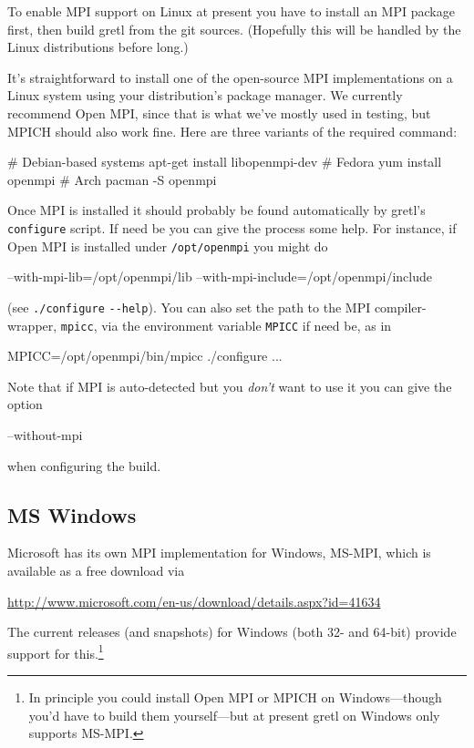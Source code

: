 \documentclass{article}
\begin{document}
To enable MPI support on Linux at present you have to install an MPI
package first, then build gretl from the git sources. (Hopefully this
will be handled by the Linux distributions before long.)

It's straightforward to install one of the open-source MPI
implementations on a Linux system using your distribution's package
manager. We currently recommend \textsf{Open MPI}, since that is what
we've mostly used in testing, but \textsf{MPICH} should also work
fine.  Here are three variants of the required command:
\begin{code}
# Debian-based systems
apt-get install libopenmpi-dev
# Fedora
yum install openmpi
# Arch
pacman -S openmpi
\end{code}

Once MPI is installed it should probably be found automatically by
gretl's \texttt{configure} script. If need be you can give the process
some help. For instance, if \textsf{Open MPI} is installed under
\texttt{/opt/openmpi} you might do
\begin{code}
--with-mpi-lib=/opt/openmpi/lib
--with-mpi-include=/opt/openmpi/include
\end{code}
(see \texttt{./configure} \verb|--help|). You can also set the path
to the MPI compiler-wrapper, \texttt{mpicc}, via the environment
variable \texttt{MPICC} if need be, as in
\begin{code}
MPICC=/opt/openmpi/bin/mpicc ./configure ...
\end{code}

Note that if MPI is auto-detected but you \emph{don't} want to use it
you can give the option 
\begin{code}
--without-mpi
\end{code}
when configuring the build.

\subsection{MS Windows}

Microsoft has its own MPI implementation for Windows, \textsf{MS-MPI},
which is available as a free download via

\url{http://www.microsoft.com/en-us/download/details.aspx?id=41634}

The current releases (and snapshots) for Windows (both 32- and 64-bit)
provide support for this.\footnote{In principle you could install
  \textsf{Open MPI} or \textsf{MPICH} on Windows---though you'd have
  to build them yourself---but at present gretl on Windows only
  supports \textsf{MS-MPI}.}
\end{document}
